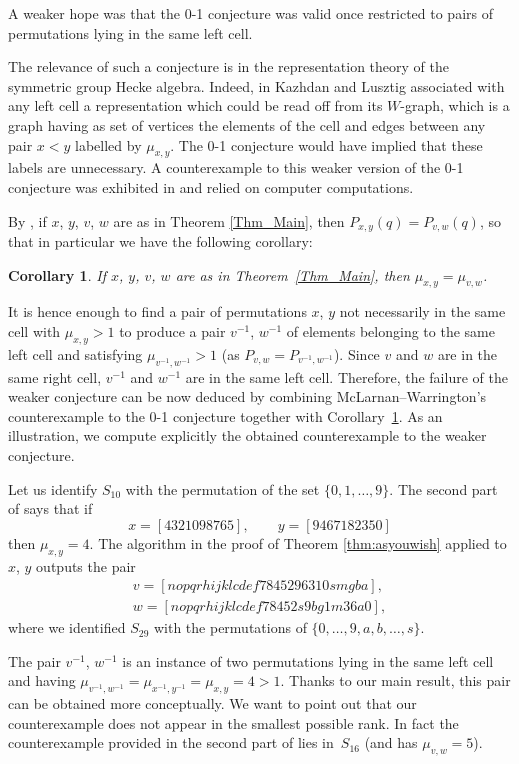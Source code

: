 \documentclass[10pt,a4paper]{amsart}
\numberwithin{equation}{section}
\newtheorem{Corollary}[Theorem]{Corollary}
\newcommand{\inv}{^{-1}}
\begin{document}
A weaker hope was that the 0-1 conjecture was valid once restricted to pairs of permutations lying in the same left cell.

The relevance of such a conjecture is in the representation theory of the symmetric group Hecke algebra. Indeed, in \cite{KL79} Kazhdan and Lusztig associated with any left cell a representation which could be read off from its $W$-graph, which is a graph having as set of vertices the elements of the cell and edges between any pair $x<y$ labelled by $\mu_{x,y}$. The 0-1 conjecture would have implied that these labels are unnecessary. A counterexample to this weaker version of the 0-1 conjecture was exhibited in \cite{mclarnanwarrington} and relied on computer computations.

By \cite[Corollary 6.3]{wooyong}, if $x$, $y$, $v$, $w$ are as in Theorem \ref{Thm_Main}, then $P_{x,y}(q)=P_{v,w}(q)$, so that in particular we have the following corollary:
\begin{Corollary}\label{Cor_01}
If $x$, $y$, $v$, $w$ are as in Theorem~{\rm \ref{Thm_Main}}, then $\mu_{x,y}=\mu_{v,w}$.
\end{Corollary}
It is hence enough to find a pair of permutations $x$, $y$ not necessarily in the same cell with $\mu_{x,y}>1$ to produce a pair $v^{-1}$, $w^{-1}$ of elements belonging to the same left cell and satisfying $\mu_{v^{-1},w^{-1}}>1$ (as $P_{v,w}=P_{v^{-1},w^{-1}}$).
Since $v$ and $w$ are in the same right cell, $v\inv$ and $w\inv$ are in the same left cell.
Therefore, the failure of the weaker conjecture can be now deduced by combining McLarnan--Warrington's counterexample to the 0-1 conjecture together with Corollary~\ref{Cor_01}. As an illustration, we compute explicitly the obtained counterexample to the weaker conjecture.

Let us identify $S_{10}$ with the permutation of the set $\{0,1,\dots, 9\}$. The second part of \cite[Theorem~1]{mclarnanwarrington} says that if
\[
x=[4321098765],\qquad y=[9467182350]
\]
then $\mu_{x,y}=4$.
The algorithm in the proof of Theorem \ref{thm:asyouwish} applied to $x$, $y$ outputs the pair
\begin{gather*}
 v=[nopqrhijklcdef7845296310smgba],\\
 w=[nopqrhijklcdef78452s9bg1m36a0],
\end{gather*}
where we identified $S_{29}$ with the permutations of $\{0,\dots, 9, a,b,\dots, s\}$.

The pair $v^{-1}$, $w^{-1}$ is an instance of two permutations lying in the same left cell and having $\mu_{v^{-1},w^{-1}}=\mu_{x^{-1},y^{-1}}=\mu_{x,y}=4>1$. Thanks to our main result, this pair can be obtained more conceptually. We want to point out that our counterexample does not appear in the smallest possible rank. In fact the counterexample provided in the second part of \cite[Theorem~1]{mclarnanwarrington} lies in~$S_{16}$ (and has $\mu_{v,w}=5$).
\end{document}
